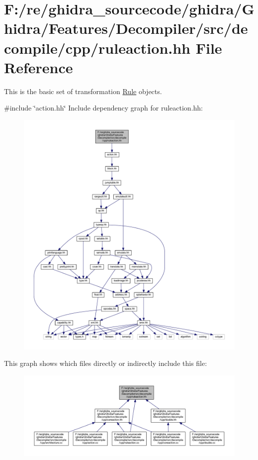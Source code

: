 \hypertarget{ruleaction_8hh}{}\section{F\+:/re/ghidra\+\_\+sourcecode/ghidra/\+Ghidra/\+Features/\+Decompiler/src/decompile/cpp/ruleaction.hh File Reference}
\label{ruleaction_8hh}


This is the basic set of transformation \mbox{\hyperlink{class_rule}{Rule}} objects.  


{\ttfamily \#include \char`\"{}action.\+hh\char`\"{}}\newline
Include dependency graph for ruleaction.\+hh\+:
\nopagebreak
\begin{figure}[H]
\begin{center}
\leavevmode
\includegraphics[width=350pt]{ruleaction_8hh__incl}
\end{center}
\end{figure}
This graph shows which files directly or indirectly include this file\+:
\nopagebreak
\begin{figure}[H]
\begin{center}
\leavevmode
\includegraphics[width=350pt]{ruleaction_8hh__dep__incl}
\end{center}
\end{figure}
